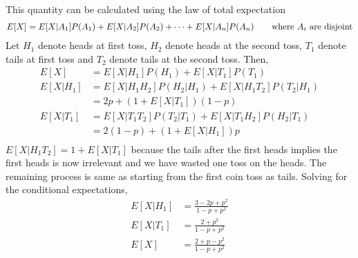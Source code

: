 \documentclass[../../probability-notes.tex]{subfiles}
\begin{document}
        This quantity can be calculated using the law of total expectation
        \begin{align*}
            E[X] = E[X|A_{1}]P(A_{1}) + E[X|A_{2}]P(A_{2}) + \cdots + E[X|A_{n}]P(A_{n}) \tag*{where $A_{i}$ are disjoint}
        \end{align*}
        Let $H_{1}$ denote heads at first toss, $H_{2}$ denote heads at the second toss, $T_{1}$ denote tails at first toss and $T_{2}$ denote tails at the second toss. Then,
        \begin{align*}
            E[X] &= E[X|H_{1}]P(H_{1}) + E[X|T_{1}]P(T_{1})\\
            E[X|H_{1}] &= E[X|H_{1}H_{2}]P(H_{2}|H_{1}) + E[X|H_{1}T_{2}]P(T_{2}|H_{1})\\
                    &= 2p + (1 + E[X|T_{1}])(1-p)\\
            E[X|T_{1}] &= E[X|T_{1}T_{2}]P(T_{2}|T_{1}) + E[X|T_{1}H_{2}]P(H_{2}|T_{1})\\
                    &= 2(1-p) + (1 + E[X|H_{1}])p\\
        \end{align*}
        $E[X|H_{1}T_{2}] = 1 + E[X|T_{1}]$ because the tails after the first heads implies the first heads is now irrelevant and we have wasted one toss on the heads. The remaining process is same as starting from the first coin toss as tails. \newline
        Solving for the conditional expectations,
        \begin{align*}
            E[X|H_{1}] &= \frac{3 - 2p + p^{2}}{1 - p + p^{2}}\\
            E[X|T_{1}] &= \frac{2 + p^{2}}{1 - p + p^{2}}\\
            E[X] &= \frac{2 + p - p^{2}}{1 - p + p^{2}}
        \end{align*}
\end{document}
